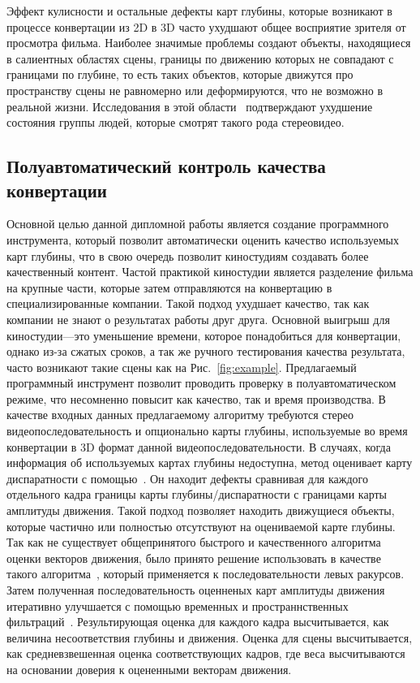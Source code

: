 \documentclass[14pt, a4paper]{extarticle}
\begin{document}
Эффект кулисности и остальные дефекты карт глубины, которые возникают в процессе 
конвертации из 2D в 3D часто ухудшают общее восприятие зрителя от просмотра фильма. 
Наиболее значимые проблемы создают объекты, находящиеся в салиентных областях 
сцены, границы по движению которых не совпадают с границами по глубине, то есть 
таких объектов, которые движутся про пространству сцены не равномерно или деформируются, 
что не возможно в реальной жизни. Исследования в этой области~\cite{jung2012visual,li2014visual} 
подтверждают ухудшение состояния группы людей, которые смотрят такого рода стереовидео.

\subsection{Полуавтоматический контроль качества конвертации}



Основной целью данной дипломной работы является создание программного инструмента, 
который позволит автоматически оценить качество используемых карт глубины,
что в свою очередь позволит киностудиям создавать более качественный контент. 
Частой практикой киностудии является разделение фильма на крупные части, которые 
затем отправляются на конвертацию в специализированные компании. Такой подход 
ухудшает качество, так как компании не знают о результатах работы друг друга. 
Основной выигрыш для киностудии---это уменьшение времени, которое понадобиться 
для конвертации, однако из-за сжатых сроков, а так же ручного тестирования 
качества результата, часто возникают такие сцены как на Рис.~\ref{fig:example}. 
Предлагаемый программный инструмент позволит проводить проверку в полуавтоматическом 
режиме, что несомненно повысит как качество, так и время производства.
В качестве входных данных предлагаемому алгоритму требуются стерео видеопоследовательность 
и опционально карты глубины, используемые во время конвертации в 3D формат данной 
видеопоследовательности. В случаях, когда информация об используемых картах 
глубины недоступна, метод оценивает карту диспаратности с помощью~\cite{simonyan2008fast,zhang2014100+}. 
Он находит дефекты сравнивая 
для каждого отдельного кадра границы карты глубины/диспаратности с границами карты 
амплитуды движения. Такой подход позволяет находить движущиеся объекты, которые 
частично или полностью отсутствуют на оцениваемой карте глубины. Так как не существует 
общепринятого быстрого и качественного алгоритма оценки векторов движения, было принято 
решение использовать в качестве такого алгоритма~\cite{simonyan2008fast}, который 
применяется к последовательности левых ракурсов. Затем полученная последовательность 
оценненых карт амплитуды движения итеративно улучшается с помощью временных и 
пространнственных фильтраций~\cite{fecker2007time,matyunin2011temporal,he2013guided}. 
Результирующая оценка для каждого кадра высчитывается, как величина несоответствия 
глубины и движения. Оценка для сцены высчитывается, как средневзвешенная оценка 
соответствующих кадров, где веса высчитываются на основании доверия 
к оцененными векторам движения.
\end{document}
